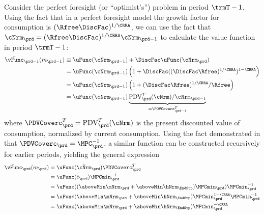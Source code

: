   Consider the perfect foresight (or ``optimist's'') problem in period $\trmT-1$.  Using the fact that in a perfect foresight model the growth factor for consumption is $(\Rfree \DiscFac)^{1/\CRRA}$, we can use the fact that $\cNrm_{\prd} = (\Rfree \DiscFac)^{1/\CRRA} \cNrm_{\prd-1}$ to calculate the value function in period $\trmT-1$:
  \begin{equation*}\begin{gathered}\begin{aligned}
        \bar{\vFunc}_{\prd-1}(m_{\prd-1})  & \equiv  \uFunc(\cNrm_{\prd-1})+\DiscFac \uFunc(\cNrm_{\prd})
        \\  & = \uFunc(\cNrm_{\prd-1})\left(1+\DiscFac ((\DiscFac\Rfree)^{1/\CRRA})^{1-\CRRA}\right)
        \\  & = \uFunc(\cNrm_{\prd-1})\left(1+(\DiscFac\Rfree)^{1/\CRRA}/\Rfree\right)
        \\  & = \uFunc(\cNrm_{\prd-1})\underbrace{\mbox{PDV}_{\prd}^{T}(\cNrm)/\cNrm_{\prd-1}}_{\equiv \PDVCoverc_{\prd-1}^{T}}
      \end{aligned}\end{gathered}\end{equation*}
  where $\PDVCoverc_{\prd}^{T}=\mbox{PDV}_{\prd}^{T}(\cNrm)$ is the present discounted value of consumption, normalized by current consumption. Using the fact demonstrated in \cite{BufferStockTheory} that $\PDVCoverc_{\prd}=\MPC^{-1}_{\prd}$, a similar function can be constructed recursively for earlier periods, yielding the general expression \hypertarget{vFuncPF}{}
  \begin{equation}\begin{gathered}\begin{aligned}
        \bar{\vFunc}_{\prd}(m_{\prd})  & = \uFunc(\bar{\cNrm}_{\prd})\PDVCoverc_{\prd}^{T}\label{eq:vFuncPF}
        \\  & = \uFunc(\bar{c}_{\prd}) \MPCmin_{\prd}^{-1} %
        \\  & = \uFunc((\aboveMin \mNrm_{\prd}+\aboveMin \hNrm_{\EndStp})\MPCmin_{\prd}) \MPCmin_{\prd}^{-1} %
        \\  & = \uFunc(\aboveMin \mNrm_{\prd}+\aboveMin \hNrm_{\EndStp})\MPCmin_{\prd}^{1-\CRRA} \MPCmin_{\prd}^{-1} %
        \\  & = \uFunc(\aboveMin \mNrm_{\prd}+\aboveMin \hNrm_{\EndStp})\MPCmin_{\prd}^{-\CRRA}  %
      \end{aligned}\end{gathered}\end{equation}


